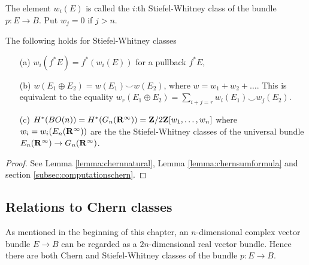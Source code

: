 \documentclass[a4paper,openany]{scrbook}
\begin{document}
\begin{defn}
The element $w_i(E)$ is called the $i$:th Stiefel-Whitney class of the bundle $p:E\to B$. Put $w_j=0$ if $j>n.$
\end{defn}

\begin{prop}
The following holds for Stiefel-Whitney classes
\begin{itemize}
 \item[(a)] $w_i(f^*E)=f^*(w_i(E))$ for a pullback $f^*E$,
 \item[(b)] $w(E_1\oplus E_2)= w(E_1)\smile w(E_2)$, where $w =w_1+w_2+\dots$. This is equivalent to the equality $w_r(E_1\oplus E_2)= \sum\limits_{i+j=r}w_i(E_1)\smile w_j(E_2)$.
 \item[(c)]\label{prop:cohomologyBO} $H^*(BO(n)) = H^*(G_n(\mathbf R^\infty))= \mathbf Z/2\mathbf Z[w_1,\dots,w_n]$ where $w_i=w_i(E_n(\mathbf R^\infty))$ are the the Stiefel-Whitney classes of the universal bundle $E_n(\mathbf R^\infty)\to G_n(\mathbf R^\infty)$.
\end{itemize}
\end{prop}

\begin{proof}
 See Lemma \ref{lemma:chernnatural}, Lemma \ref{lemma:chernsumformula} and section \ref{subsec:computationschern}.
\end{proof}

\subsection{Relations to Chern classes}\label{subsec:relationstochern}
As mentioned in the beginning of this chapter, an $n$-dimensional complex vector bundle $E\to B$ can be regarded as a $2n$-dimensional real vector bundle. Hence there are both Chern and Stiefel-Whitney classes of the bundle $p:E\to B$.
\end{document}
